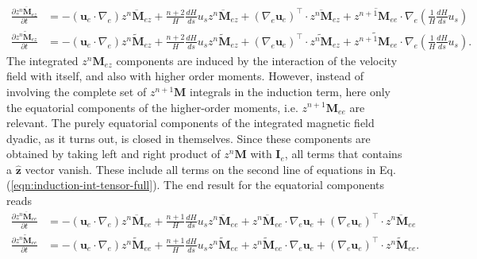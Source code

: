 \begin{equation}\label{eqn:induction-int-tensor-e-z}
    \begin{aligned}
        \frac{\partial \overline{z^n \mathbf{M}_{ez}}}{\partial t} &= - (\mathbf{u}_e\cdot \nabla_e) \overline{z^n \mathbf{M}_{ez}} + \frac{n+2}{H}\frac{dH}{ds} u_s \overline{z^n \mathbf{M}_{ez}} + \left(\nabla_e \mathbf{u}_e\right)^\top\cdot \overline{z^n \mathbf{M}}_{ez} + \overline{z^{n+1} \mathbf{M}_{ee}}\cdot \nabla_e \left(\frac{1}{H}\frac{dH}{ds}u_s\right) \\ 
        \frac{\partial \widetilde{z^n \mathbf{M}_{ez}}}{\partial t} &= - (\mathbf{u}_e\cdot \nabla_e) \widetilde{z^n \mathbf{M}_{ez}} + \frac{n+2}{H}\frac{dH}{ds} u_s \widetilde{z^n \mathbf{M}_{ez}} + \left(\nabla_e \mathbf{u}_e\right)^\top\cdot \widetilde{z^n \mathbf{M}}_{ez} + \widetilde{z^{n+1} \mathbf{M}_{ee}}\cdot \nabla_e \left(\frac{1}{H}\frac{dH}{ds}u_s\right).
    \end{aligned}
\end{equation}
The integrated $z^n \mathbf{M}_{ez}$ components are induced by the interaction of the velocity field with itself, and also with higher order moments. However, instead of involving the complete set of $z^{n+1}\mathbf{M}$ integrals in the induction term, here only the equatorial components of the higher-order moments, i.e. $z^{n+1} \mathbf{M}_{ee}$ are relevant.
The purely equatorial components of the integrated magnetic field dyadic, as it turns out, is closed in themselves. Since these components are obtained by taking left and right product of $z^n\mathbf{M}$ with $\mathbf{I}_e$, all terms that contains a $\hat{\mathbf{z}}$ vector vanish. These include all terms on the second line of equations in Eq. (\ref{eqn:induction-int-tensor-full}). The end result for the equatorial components reads
\begin{equation}\label{eqn:induction-int-tensor-eq}
    \begin{aligned}
        \frac{\partial \overline{z^n \mathbf{M}_{ee}}}{\partial t} &= - (\mathbf{u}_e\cdot \nabla_e) \overline{z^n \mathbf{M}_{ee}} + \frac{n+1}{H}\frac{dH}{ds} u_s \overline{z^n \mathbf{M}_{ee}} + \overline{z^n \mathbf{M}_{ee}}\cdot \nabla_e \mathbf{u}_e + \left(\nabla_e \mathbf{u}_e\right)^\top\cdot \overline{z^n \mathbf{M}_{ee}} \\ 
        \frac{\partial \widetilde{z^n \mathbf{M}_{ee}}}{\partial t} &= - (\mathbf{u}_e\cdot \nabla_e) \widetilde{z^n \mathbf{M}_{ee}} + \frac{n+1}{H}\frac{dH}{ds} u_s \widetilde{z^n \mathbf{M}_{ee}} + \widetilde{z^n \mathbf{M}_{ee}}\cdot \nabla_e \mathbf{u}_e + \left(\nabla_e \mathbf{u}_e\right)^\top\cdot \widetilde{z^n \mathbf{M}_{ee}}.
    \end{aligned}
\end{equation}

